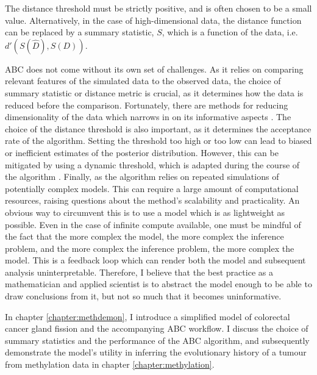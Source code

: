 The distance threshold must be strictly positive, and is often chosen to be a
small value. Alternatively, in the case of high-dimensional data, the distance
function can be replaced by a summary statistic, $S$, which is a function of
the data, i.e. $d'(S(\hat D), S(D))$. \par
ABC does not come without its own set of challenges. As it relies on comparing
relevant features of the simulated data to the observed data, the choice of
summary statistic or distance metric is crucial, as it determines how the data
is reduced before the comparison. Fortunately, there are methods for reducing
dimensionality of the data which narrows in on its informative aspects
\cite{blum_comparative_2013}. The choice of the distance threshold is also
important, as it determines the acceptance rate of the algorithm. Setting the
threshold too high or too low can lead to biased or inefficient estimates of
the posterior distribution. However, this can be mitigated by using a dynamic
threshold, which is adapted during the course of the algorithm
\cite{prangle_adapting_2017}. Finally, as the algorithm relies on repeated
simulations of potentially complex models. This can require a large amount of
computational resources, raising questions about the method's scalability and
practicality. An obvious way to circumvent this is to use a model which is as
lightweight as possible. Even in the case of infinite compute available, one
must be mindful of the fact that the more complex the model, the more complex
the inference problem, and the more complex the inference problem, the more
complex the model. This is a feedback loop which can render both the model and
subsequent analysis uninterpretable. Therefore, I believe that the best
practice as a mathematician and applied scientist is to abstract the model
enough to be able to draw conclusions from it, but not so much that it becomes
uninformative. \par
In chapter \ref{chapter:methdemon}, I introduce a simplified model of
colorectal cancer gland fission and the accompanying ABC workflow. I discuss
the choice of summary statistics and the performance of the ABC algorithm, and
subsequently demonstrate the model's utility in inferring the evolutionary
history of a tumour from methylation data in chapter \ref{chapter:methylation}.


